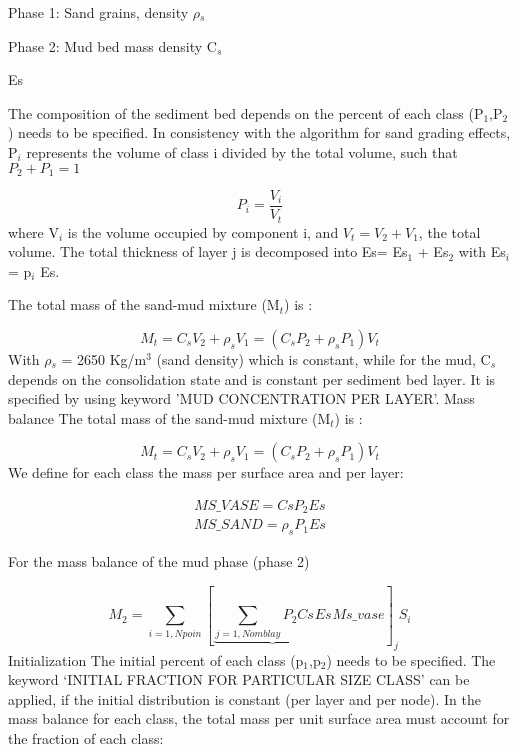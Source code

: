 Phase 1: Sand grains, density $\rho$$_{s}$

Phase 2: Mud bed mass density C$_{s}$

Es

The composition of the sediment bed depends on the percent of each class (P$%
_{1}$,P$_{2}$) needs to be specified. In consistency with the algorithm for
sand grading effects, P$_{i}$ represents the volume of class i divided by
the total volume, such that $P_{2} +P_{1} =1$

\begin{equation*}
P_{i} =\frac{V_{i} }{V_{t} } 
\end{equation*}
where V$_{i}$ is the volume occupied by component i, and $V_{t} =V_{2}
+V_{1} $, the total volume.\newline
The total thickness of layer j is decomposed into Es= Es$_{1}$ + Es$_{2}$
with Es$_{i}$ = p$_{i}$ Es.

The total mass of the sand-mud mixture (M$_{t}$) is :

\begin{equation*}
M_{t} =C_{s} V_{2} +\rho _{s} V_{1} =\left( C_{s} P_{2} +\rho _{s} P_{1}
\right) V_{t} 
\end{equation*}
With $\rho$$_{s}$ = 2650 Kg/m$^{3}$ (sand density) which is constant, while
for the mud, C$_{s}$ depends on the consolidation state and is constant per
sediment bed layer. It is specified by using keyword 'MUD CONCENTRATION PER
LAYER'.\newline
Mass balance\newline
The total mass of the sand-mud mixture (M$_{t}$) is :

\begin{equation*}
M_{t} =C_{s} V_{2} +\rho _{s} V_{1} =\left( C_{s} P_{2} +\rho _{s} P_{1}
\right) V_{t} 
\end{equation*}
We define for each class the mass per surface area and per layer:

\begin{gather*}
MS\_VASE=CsP_{2} Es \\
MS\_SAND=\rho _{s} P_{1} Es
\end{gather*}

For the mass balance of the mud phase (phase 2)

\begin{equation*}
M_{2} =\sum\limits_{i=1,Npoin}\left[ \underbrace{\sum%
\limits_{j=1,Nomblay}P_{2}^{} Cs_{}^{} Es_{} } Ms\_vase\right] _{j} S_{i} 
\end{equation*}%
Initialization\newline
The initial percent of each class (p$_{1}$,p$_{2}$) needs to be specified.
The keyword `INITIAL FRACTION FOR PARTICULAR SIZE CLASS' can be applied, if
the initial distribution is constant (per layer and per node). \newline
In the mass balance for each class, the total mass per unit surface area
must account for the fraction of each class:


